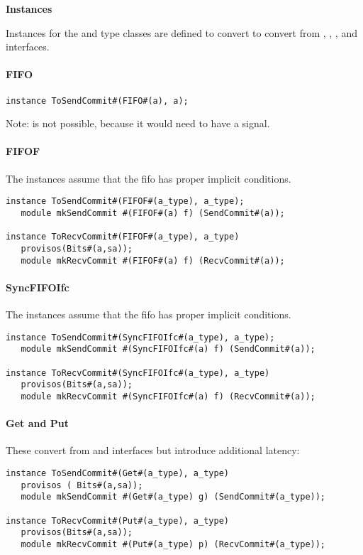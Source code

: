 {\bf Instances}

Instances for the  and  type classes
are defined to convert to convert from , ,
,  and   interfaces.

\paragraph{FIFO}
\begin{verbatim}
instance ToSendCommit#(FIFO#(a), a);
\end{verbatim}
Note:   is not possible,
because it would need to have a  signal.

\paragraph{FIFOF}
   The  instances assume that the fifo has proper implicit conditions.
\begin{verbatim}
instance ToSendCommit#(FIFOF#(a_type), a_type);
   module mkSendCommit #(FIFOF#(a) f) (SendCommit#(a));

instance ToRecvCommit#(FIFOF#(a_type), a_type)
   provisos(Bits#(a,sa));
   module mkRecvCommit #(FIFOF#(a) f) (RecvCommit#(a));
\end{verbatim}

\paragraph{SyncFIFOIfc}

   The  instances assume that the fifo has proper
   implicit conditions. 

\begin{verbatim}
instance ToSendCommit#(SyncFIFOIfc#(a_type), a_type);
   module mkSendCommit #(SyncFIFOIfc#(a) f) (SendCommit#(a));

instance ToRecvCommit#(SyncFIFOIfc#(a_type), a_type)
   provisos(Bits#(a,sa));
   module mkRecvCommit #(SyncFIFOIfc#(a) f) (RecvCommit#(a));
\end{verbatim}

\paragraph{Get and Put}

These convert from  and  interfaces but introduce
additional latency:
\begin{verbatim}
instance ToSendCommit#(Get#(a_type), a_type)
   provisos ( Bits#(a,sa));
   module mkSendCommit #(Get#(a_type) g) (SendCommit#(a_type));

instance ToRecvCommit#(Put#(a_type), a_type)
   provisos(Bits#(a,sa));
   module mkRecvCommit #(Put#(a_type) p) (RecvCommit#(a_type));
\end{verbatim}

